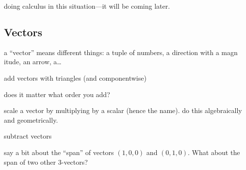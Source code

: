 \documentclass[12pt]{article}
\begin{document}
doing calculus in this situation---it will be coming later.

\subsection{Vectors}

a ``vector'' means different things: a tuple of numbers, a direction with a magn itude, an arrow, a\ldots

add vectors with triangles (and componentwise)

does it matter what order you add?

scale a vector by multiplying by a scalar (hence the name).  do this algebraically and geometrically.

subtract vectors

say a bit about the ``span'' of vectors $(1,0,0)$ and $(0,1,0)$.  What about the span of two other 3-vectors?
\end{document}

